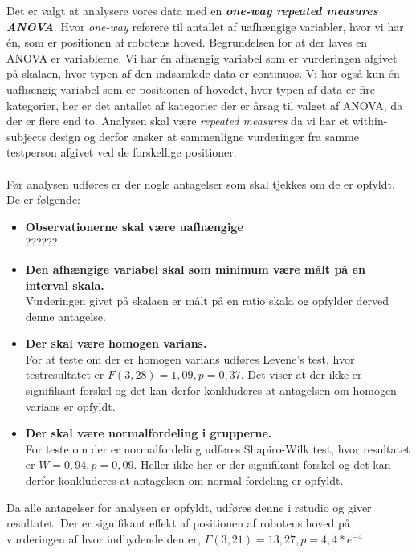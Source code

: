 \noindent Det er valgt at analysere vores data med en \textbf{\textit{one-way repeated measures ANOVA}}. Hvor \textit{one-way} referere til antallet af uafhængige variabler, hvor vi har én, som er positionen af robotens hoved. 
Begrundelsen for at der laves en ANOVA er variablerne. Vi har én afhængig variabel som er vurderingen afgivet på skalaen, hvor typen af den indsamlede data er continuos. Vi har også kun én uafhængig variabel som er positionen af hovedet, hvor typen af data er fire kategorier, her er det antallet af kategorier der er årsag til valget af ANOVA, da der er flere end to. 
Analysen skal være \textit{repeated measures} da vi har et within-subjects design og derfor ønsker at sammenligne vurderinger fra samme testperson afgivet ved de forskellige positioner. 
\\\\
Før analysen udføres er der nogle antagelser som skal tjekkes om de er opfyldt. De er følgende: 
\begin{itemize}
	\item \textbf{Observationerne skal være uafhængige}\\
	?????? 
	\item \textbf{Den afhængige variabel skal som minimum være målt på en interval skala.}\\
	Vurderingen givet på skalaen er målt på en ratio skala og opfylder derved denne antagelse.
	\item \textbf{Der skal være homogen varians. }\\
	For at teste om der er homogen varians udføres Levene's test, hvor testresultatet er $F(3,28)=1,09, p=0,37$. Det viser at der ikke er signifikant forskel og det kan derfor konkluderes at antagelsen om homogen varians er opfyldt. 
	\item \textbf{Der skal være normalfordeling i grupperne.}\\
	For teste om der er normalfordeling udføres Shapiro-Wilk test, hvor resultatet er $W=0,94, p=0,09$. Heller ikke her er der signifikant forskel og det kan derfor konkluderes at antagelsen om normal fordeling er opfyldt.
\end{itemize}

\noindent Da alle antagelser for analysen er opfyldt, udføres denne i rstudio og giver resultatet: 
Der er signifikant effekt af positionen af robotens hoved på vurderingen af hvor indbydende den er, $F(3,21)=13,27, p=4,4*e^{-4}$

